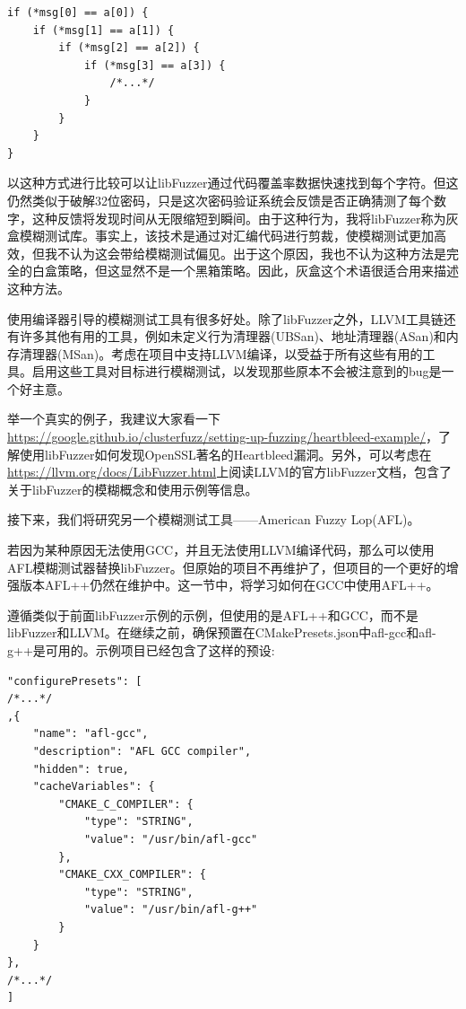 \begin{lstlisting}[style=styleCXX]
if (*msg[0] == a[0]) {
	if (*msg[1] == a[1]) {
		if (*msg[2] == a[2]) {
			if (*msg[3] == a[3]) {
				/*...*/
			}
		}
	}
}
\end{lstlisting}

以这种方式进行比较可以让libFuzzer通过代码覆盖率数据快速找到每个字符。但这仍然类似于破解32位密码，只是这次密码验证系统会反馈是否正确猜测了每个数字，这种反馈将发现时间从无限缩短到瞬间。由于这种行为，我将libFuzzer称为灰盒模糊测试库。事实上，该技术是通过对汇编代码进行剪裁，使模糊测试更加高效，但我不认为这会带给模糊测试偏见。出于这个原因，我也不认为这种方法是完全的白盒策略，但这显然不是一个黑箱策略。因此，灰盒这个术语很适合用来描述这种方法。 

使用编译器引导的模糊测试工具有很多好处。除了libFuzzer之外，LLVM工具链还有许多其他有用的工具，例如未定义行为清理器(UBSan)、地址清理器(ASan)和内存清理器(MSan)。考虑在项目中支持LLVM编译，以受益于所有这些有用的工具。启用这些工具对目标进行模糊测试，以发现那些原本不会被注意到的bug是一个好主意。

举一个真实的例子，我建议大家看一下\url{https://google.github.io/clusterfuzz/setting-up-fuzzing/heartbleed-example/}，了解使用libFuzzer如何发现OpenSSL著名的Heartbleed漏洞。另外，可以考虑在\url{https://llvm.org/docs/LibFuzzer.html}上阅读LLVM的官方libFuzzer文档，包含了关于libFuzzer的模糊概念和使用示例等信息。

接下来，我们将研究另一个模糊测试工具——American Fuzzy Lop(AFL)。


若因为某种原因无法使用GCC，并且无法使用LLVM编译代码，那么可以使用AFL模糊测试器替换libFuzzer。但原始的项目不再维护了，但项目的一个更好的增强版本AFL++仍然在维护中。这一节中，将学习如何在GCC中使用AFL++。

遵循类似于前面libFuzzer示例的示例，但使用的是AFL++和GCC，而不是libFuzzer和LLVM。在继续之前，确保预置在CMakePresets.json中afl-gcc和afl-g++是可用的。示例项目已经包含了这样的预设:

\begin{lstlisting}[style=styleCMake]
"configurePresets": [
/*...*/
,{
	"name": "afl-gcc",
	"description": "AFL GCC compiler",
	"hidden": true,
	"cacheVariables": {
		"CMAKE_C_COMPILER": {
			"type": "STRING",
			"value": "/usr/bin/afl-gcc"
		},
		"CMAKE_CXX_COMPILER": {
			"type": "STRING",
			"value": "/usr/bin/afl-g++"
		}
	}
},
/*...*/
]
\end{lstlisting}

